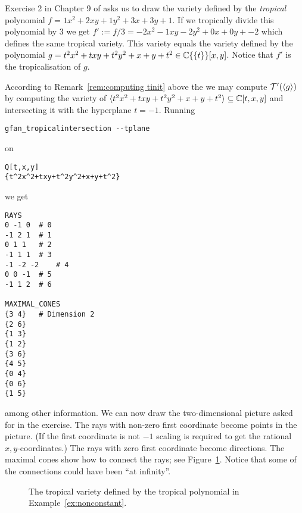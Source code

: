 \begin{example}
\label{ex:nonconstant}
Exercise 2 in Chapter 9 of \cite{sturmfelssolving} asks us to draw the variety
defined by the \emph{tropical} polynomial
$f=1x^2+2xy+1y^2+3x+3y+1$. If we tropically divide this polynomial by $3$ we get $f':=f/3=-2x^2-1xy-2y^2+0x+0y+-2$ which defines the same tropical variety. This variety equals the variety defined by
the polynomial $g=t^2x^2+txy+t^2y^2+x+y+t^2\in\mathbb{C}\{\{t\}\}[x,y]$. Notice that $f'$ is the tropicalisation of $g$.

According to Remark~\ref{rem:computing tinit} above the we may compute $ \mathcal{T} '(\langle g\rangle)$ by computing
the variety of $\langle t^2x^2+txy+t^2y^2+x+y+t^2\rangle\subseteq \mathbb{C}[t,x,y]$ and intersecting it with the hyperplane $t=-1$.
Running
\begin{verbatim}
gfan_tropicalintersection --tplane
\end{verbatim}
on
\begin{verbatim}
Q[t,x,y]
{t^2x^2+txy+t^2y^2+x+y+t^2}
\end{verbatim}
we get
\begin{verbatim}
RAYS
0 -1 0	# 0
-1 2 1	# 1
0 1 1	# 2
-1 1 1	# 3
-1 -2 -2	# 4
0 0 -1	# 5
-1 1 2	# 6

MAXIMAL_CONES
{3 4}	# Dimension 2
{2 6}
{1 3}
{1 2}
{3 6}
{4 5}
{0 4}
{0 6}
{1 5}
\end{verbatim}
among other information. We can now draw the two-dimensional picture
asked for in the exercise.  The rays with non-zero first coordinate
become points in the picture. (If the first coordinate is not $-1$ scaling
is required to get the rational $x,y$-coordinates.) The rays with zero
first coordinate become directions. The maximal cones show how to
connect the rays; see Figure~\ref{fig:nonconstant}. Notice that some
of the connections could have been ``at infinity''.
\begin{figure}
\begin{center}
\end{center}
\caption{The tropical variety defined by the tropical polynomial in Example~\ref{ex:nonconstant}.}
\label{fig:nonconstant}
\end{figure}

\end{example}

